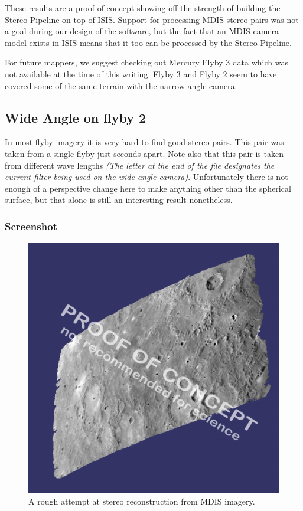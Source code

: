 These results are a proof of concept showing off the strength of
building the Stereo Pipeline on top of ISIS. Support for
processing MDIS stereo pairs was not a goal during our design of the
software, but the fact that an MDIS camera model exists in ISIS means
that it too can be processed by the Stereo Pipeline.

For future mappers, we suggest checking out Mercury Flyby 3 data which
was not available at the time of this writing. Flyby 3 and Flyby 2
seem to have covered some of the same terrain with the narrow angle
camera.

\subsection{Wide Angle on flyby 2}

In most flyby imagery it is very hard to find good stereo pairs. This
pair was taken from a single flyby just seconds apart. Note also that
this pair is taken from different wave lengths \emph{(The letter at
  the end of the file designates the current filter being used on the
  wide angle camera)}. Unfortunately there is not enough of a
perspective change here to make anything other than the spherical
surface, but that alone is still an interesting result nonetheless.

\subsubsection*{Screenshot}

\begin{figure}[h!]
  \begin{center}
  \includegraphics[width=5in]{images/examples/mdis/mdis_wide_example.png}
  \end{center}
  \caption{ A rough attempt at stereo reconstruction from MDIS imagery. }
  \label{fig:mdis_attempt}
\end{figure}

